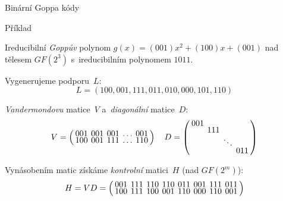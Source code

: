 \documentclass{beamer}
\begin{document}
\begin{frame}{Binární Goppa kódy}

    \begin{exampleblock}{Příklad}

        Ireducibilní \emph{Goppův} polynom $g(x) = (001)x^2 + (100)x + (001)$ nad
        tělesem $GF(2^3)$ s~ireducibilním polynomem $1011$.

        Vygenerujeme podporu~$L$:
        $$
            L = \left(
                    100, 001, 111, 011, 010, 000, 101, 110
            \right)
        $$

        \emph{Vandermondovu} matice~$V$ a~\emph{diagonální} matice~$D$:
        $$
            \arraycolsep=2pt
            \def\arraystretch{0.5}
            V = \left(
                \begin{array}{*{5}{c}}
                    001 & 001 & 001 & \ldots & 001 \\
                    100 & 001 & 111 & \ldots & 110 \\
                \end{array}
            \right)
            \quad
            D = \left(
                \begin{array}{*{4}{c}}
                    001 &     &     &     \\
                        & 111 &     &     \\
                        &     & \ddots &     \\
                        &     &     & 011 \\
                \end{array}
            \right)
        $$

        Vynásobením matic získáme \emph{kontrolní} matici~$H$ (nad $GF(2^m)$):
        $$
            \arraycolsep=2pt
            \def\arraystretch{0.5}
            H = VD = \left(
                \begin{array}{*{8}{c}}
                    001 & 111 & 110 & 110 & 011 & 001 & 111 & 011 \\
                    100 & 111 & 100 & 001 & 110 & 000 & 110 & 001 \\
                \end{array}
            \right)
        $$

    \end{exampleblock}

\end{frame}
\end{document}
